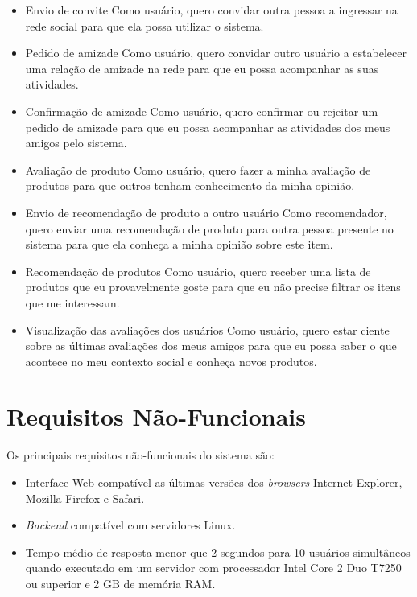 \begin{itemize}
  
  \item Envio de convite
  \subitem Como usuário, quero convidar outra pessoa a ingressar na rede social para que ela possa utilizar o sistema.
  
  \item Pedido de amizade
  \subitem Como usuário, quero convidar outro usuário a estabelecer uma relação de amizade na rede para que eu possa acompanhar as suas atividades.
  
  \item Confirmação de amizade
  \subitem Como usuário, quero confirmar ou rejeitar um pedido de amizade para que eu possa acompanhar as atividades dos meus amigos pelo sistema.
	
	\item Avaliação de produto
  \subitem Como usuário, quero fazer a minha avaliação de produtos para que outros tenham conhecimento da minha opinião.
  
	\item Envio de recomendação de produto a outro usuário
  \subitem Como recomendador, quero enviar uma recomendação de produto para outra pessoa presente no sistema para que ela conheça a minha opinião sobre este item.
  
	\item Recomendação de produtos
	\subitem Como usuário, quero receber uma lista de produtos que eu provavelmente goste para que eu não precise filtrar os itens que me interessam.

    \item Visualização das avaliações dos usuários
    \subitem Como usuário, quero estar ciente sobre as últimas avaliações dos meus amigos para que eu possa saber o que acontece no meu contexto social e conheça novos produtos.
	
\end{itemize}

\section{Requisitos Não-Funcionais}

Os principais requisitos não-funcionais do sistema são:

\begin{itemize}

    \item Interface Web compatível as últimas versões dos \textit{browsers} Internet Explorer, Mozilla Firefox e Safari.
    
    \item \textit{Backend} compatível com servidores Linux.

    \item Tempo médio de resposta menor que 2 segundos para 10 usuários simultâneos quando executado em um servidor com processador Intel Core 2 Duo T7250 ou superior e 2 GB de memória RAM. %

\end{itemize}

